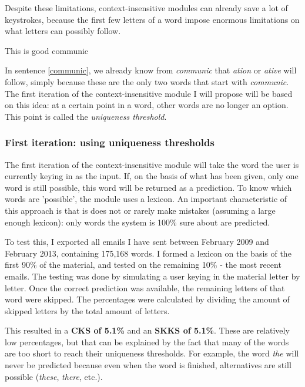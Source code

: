 \documentclass[11pt]{article}
\begin{document}
Despite these limitations, context-insensitive modules can already save a lot of keystrokes, because the first few letters of a word impose enormous limitations on what letters can possibly follow.

\begin{examples}
\item This is good communic \label{communic}
\end{examples}

In sentence \ref{communic}, we already know from \emph{communic} that \emph{ation} or \emph{ative} will follow, simply because these are the only two words that start with \emph{communic}. The first iteration of the context-insensitive module I will propose will be based on this idea: at a certain point in a word, other words are no longer an option. This point is called the \emph{uniqueness threshold}.

\subsubsection{First iteration: using uniqueness thresholds}

The first iteration of the context-insensitive module will take the word the user is currently keying in as the input. If, on the basis of what has been given, only one word is still possible, this word will be returned as a prediction. To know which words are 'possible', the module uses a lexicon. An important characteristic of this approach is that is does not or rarely make mistakes (assuming a large enough lexicon): only words the system is 100\% sure about are predicted.

To test this, I exported all emails I have sent between February 2009 and February 2013, containing 175,168 words. I formed a lexicon on the basis of the first 90\% of the material, and tested on the remaining 10\% - the most recent emails. The testing was done by simulating a user keying in the material letter by letter. Once the correct prediction was available, the remaining letters of that word were skipped. The percentages were calculated by dividing the amount of skipped letters by the total amount of letters.

This resulted in a \textbf{CKS of 5.1\%} and an \textbf{SKKS of 5.1\%}. These are relatively low percentages, but that can be explained by the fact that many of the words are too short to reach their uniqueness thresholds. For example, the word \emph{the} will never be predicted because even when the word is finished, alternatives are still possible (\emph{these}, \emph{there}, etc.).
\end{document}

